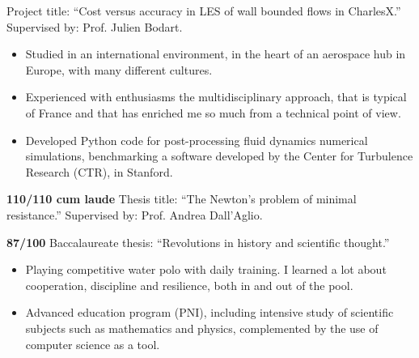 	Project title: ``Cost versus accuracy in LES of wall bounded flows in CharlesX.'' Supervised by: Prof. Julien Bodart. \\
	\medskip
	\begin{itemize}
		\item Studied in an international environment, in the heart of an aerospace hub in Europe, with many different cultures.
		\item Experienced with enthusiasms the multidisciplinary  approach, that is typical of France and that has enriched me so much from a technical point of view.
		\item Developed Python code for post-processing fluid dynamics numerical simulations, benchmarking a software developed by the Center for Turbulence Research (CTR), in Stanford.
	\end{itemize}
	\medskip

	\divider

	\textbf{110/110 cum laude} Thesis title: ``The Newton's problem of minimal resistance.'' Supervised by: Prof. Andrea Dall'Aglio. \\
	\medskip
	\cvtag{\LaTeX}

	\divider

	\textbf{87/100} Baccalaureate thesis: ``Revolutions in history and scientific thought.''
	\medskip\
	\begin{itemize}
		\item Playing competitive water polo with daily training. I learned a lot about cooperation, discipline and resilience, both in and out of the pool.
		\item Advanced education program (PNI), including intensive study of scientific subjects such as mathematics and physics, complemented by the use of computer science as a tool.
	\end{itemize}

